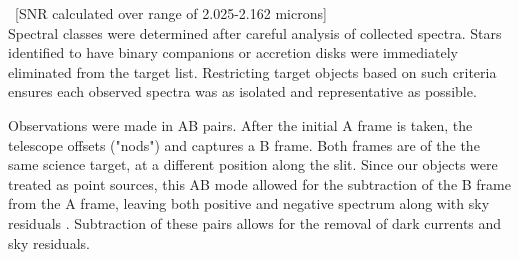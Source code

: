 ~[SNR calculated over range of 2.025-2.162 microns]\\

Spectral classes were determined after careful analysis of collected spectra.  Stars identified to have binary companions \cite{binary_guy} or accretion disks \cite{binary_guy} were immediately eliminated from the target list.
Restricting target objects based on such criteria ensures each observed spectra was as isolated and representative as possible.


Observations were made in AB pairs.  After the initial A frame is taken, the telescope offsets ("nods") and captures a B frame.  Both frames are of the the same science target, at a different position along the slit.  Since our objects were treated as point sources, this AB mode allowed for the subtraction of the B frame from the A frame, leaving both positive and negative spectrum along with sky residuals \cite{Cushing_2004}. Subtraction of these pairs allows for the removal of dark currents and sky residuals.



